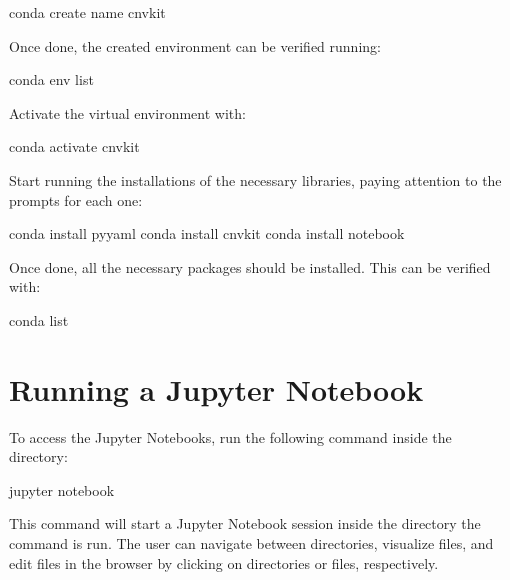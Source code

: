 \documentclass[letterpaper,10pt,english]{sphinxhowto}
\begin{document}
\begin{sphinxVerbatim}[commandchars=\\\{\}]
\PYGZdl{} conda create \PYGZhy{}\PYGZhy{}name cnvkit
\end{sphinxVerbatim}

\sphinxAtStartPar
Once done, the created environment can be verified running:

\begin{sphinxVerbatim}[commandchars=\\\{\}]
\PYGZdl{} conda env list
\end{sphinxVerbatim}

\sphinxAtStartPar
Activate the virtual environment with:

\begin{sphinxVerbatim}[commandchars=\\\{\}]
\PYGZdl{} conda activate cnvkit
\end{sphinxVerbatim}

\sphinxAtStartPar
Start running the installations of the necessary libraries, paying attention to the prompts for each one:

\begin{sphinxVerbatim}[commandchars=\\\{\}]
\PYGZdl{} conda install pyyaml
\PYGZdl{} conda install cnvkit
\PYGZdl{} conda install notebook
\end{sphinxVerbatim}

\sphinxAtStartPar
Once done, all the necessary packages should be installed. This can be verified with:

\begin{sphinxVerbatim}[commandchars=\\\{\}]
\PYGZdl{} conda list
\end{sphinxVerbatim}


\section{Running a Jupyter Notebook}
\label{\detokenize{index:running-a-jupyter-notebook}}
\sphinxAtStartPar
To access the Jupyter Notebooks, run the following command inside the  directory:

\begin{sphinxVerbatim}[commandchars=\\\{\}]
\PYGZdl{} jupyter notebook
\end{sphinxVerbatim}

\sphinxAtStartPar
This command will start a Jupyter Notebook session inside the directory the command is run. The user can navigate between directories, visualize files, and edit files in the browser by clicking on directories or files, respectively.
\end{document}

